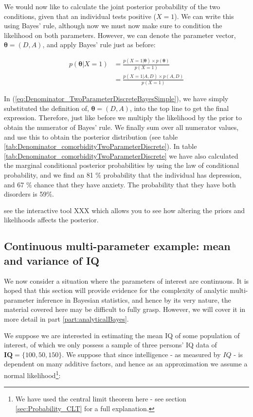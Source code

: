\documentclass[11pt,fullpage]{book}
\begin{document}
We would now like to calculate the joint posterior probability of the two conditions, given that an individual tests positive ($X=1$). We can write this using Bayes' rule, although now we must now make sure to condition the likelihood on both parameters. However, we can denote the parameter vector, $\boldsymbol{\theta}=(D,A)$, and apply Bayes' rule just as before:

\begin{align}\label{eq:Denominator_TwoParameterDiscreteBayesSimple}
p(\boldsymbol{\theta}|X=1) &= \frac{p(X=1|\boldsymbol{\theta})\times p(\boldsymbol{\theta})}{p(X=1)}\\
& = \frac{p(X=1|A,D)\times p(A,D)}{p(X=1)}
\end{align}

In (\ref{eq:Denominator_TwoParameterDiscreteBayesSimple}), we have simply substituted the definition of, $\boldsymbol{\theta}=(D,A)$, into the top line to get the final expression. Therefore, just like before we multiply the likelihood by the prior to obtain the numerator of Bayes' rule. We finally sum over all numerator values, and use this to obtain the posterior distribution (see table \ref{tab:Denominator_comorbidityTwoParameterDiscrete}). In table \ref{tab:Denominator_comorbidityTwoParameterDiscrete} we have also calculated the marginal conditional posterior probabilities by using the law of conditional probability, and we find an 81 \% probability that the individual has depression, and 67 \% chance that they have anxiety. The probability that they have both disorders is 59\%.

 see the interactive tool XXX which allows you to see how altering the priors and likelihoods affects the posterior.

\subsection{Continuous multi-parameter example: mean and variance of IQ}\label{sec:Denominator_continuousTwoParameterIQ}
We now consider a situation where the parameters of interest are continuous. It is hoped that this section will provide evidence for the complexity of analytic multi-parameter inference in Bayesian statistics, and hence by its very nature, the material covered here may be difficult to fully grasp. However, we will cover it in more detail in part \ref{part:analyticalBayes}.

We suppose we are interested in estimating the mean IQ of some population of interest, of which we only possess a sample of three persons' IQ data of $\boldsymbol{IQ}=\{100,50,150\}$. We suppose that since intelligence - as measured by $IQ$ - is dependent on many additive factors, and hence as an approximation we assume a normal likelihood\footnote{We have used the central limit theorem here - see section \ref{sec:Probability_CLT} for a full explanation.}:
\end{document}
